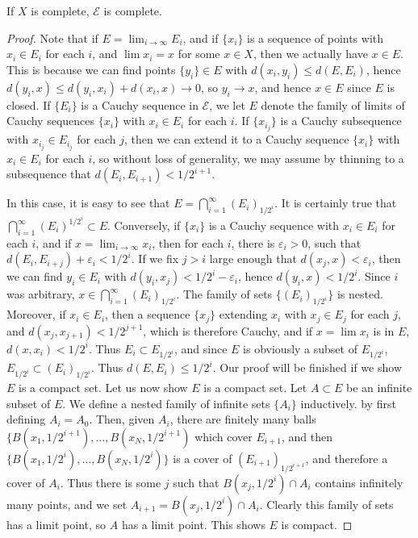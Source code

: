 \begin{theorem}
	If $X$ is complete, $\mathcal{E}$ is complete.
\end{theorem}
\begin{proof}
	Note that if $E = \lim_{i \to \infty} E_i$, and if $\{ x_i \}$ is a sequence of points with $x_i \in E_i$ for each $i$, and $\lim x_i = x$ for some $x \in X$, then we actually have $x \in E$. This is because we can find points $\{ y_i \} \in E$ with $d(x_i,y_i) \leq d(E,E_i)$, hence $d(y_i,x) \leq d(y_i,x_i) + d(x_i,x) \to 0$, so $y_i \to x$, and hence $x \in E$ since $E$ is closed. If $\{ E_i \}$ is a Cauchy sequence in $\mathcal{E}$, we let $E$ denote the family of limits of Cauchy sequences $\{ x_i \}$ with $x_i \in E_i$ for each $i$. If $\{ x_{i_j} \}$ is a Cauchy subsequence with $x_{i_j} \in E_{i_j}$ for each $j$, then we can extend it to a Cauchy sequence $\{ x_i \}$ with $x_i \in E_i$ for each $i$, so without loss of generality, we may assume by thinning to a subsequence that $d(E_i,E_{i+1}) < 1/2^{i+1}$.

	In this case, it is easy to see that $E = \bigcap_{i = 1}^\infty (E_i)_{1/2^i}$. It is certainly true that $\bigcap_{i = 1}^\infty (E_i)^{1/2^i} \subset E$. Conversely, if $\{ x_i \}$ is a Cauchy sequence with $x_i \in E_i$ for each $i$, and if $x = \lim_{i \to \infty} x_i$, then for each $i$, there is $\varepsilon_i > 0$, such that $d(E_i,E_{i+j}) + \varepsilon_i < 1/2^i$. If we fix $j > i$ large enough that $d(x_j,x) < \varepsilon_i$, then we can find $y_i \in E_i$ with $d(y_i,x_j) < 1/2^i - \varepsilon_i$, hence $d(y_i,x) < 1/2^i$. Since $i$ was arbitrary, $x \in \bigcap_{i = 1}^\infty (E_i)_{1/2^i}$. The family of sets $\{ (E_i)_{1/2^i} \}$ is nested. Moreover, if $x_i \in E_i$, then a sequence $\{ x_j \}$ extending $x_i$ with $x_j \in E_j$ for each $j$, and $d(x_j,x_{j+1}) < 1/2^{j+1}$, which is therefore Cauchy, and if $x = \lim x_i$ is in $E$, $d(x,x_i) < 1/2^i$. Thus $E_i \subset E_{1/2^i}$, and since $E$ is obviously a subset of $E_{1/2^i}$, $E_{1/2^i} \subset (E_i)_{1/2^i}$. Thus $d(E,E_i) \leq 1/2^i$. Our proof will be finished if we show $E$ is a compact set. Let us now show $E$ is a compact set. Let $A \subset E$ be an infinite subset of $E$. We define a nested family of infinite sets $\{ A_i \}$ inductively. by first defining $A_i = A_0$. Then, given $A_i$, there are finitely many balls $\{ B(x_1,1/2^{i+1}), \dots, B(x_N,1/2^{i+1})$ which cover $E_{i+1}$, and then $\{ B(x_1,1/2^i), \dots, B(x_N,1/2^i) \}$ is a cover of $(E_{i+1})_{1/2^{i+1}}$, and therefore a cover of $A_i$. Thus there is some $j$ such that $B(x_j,1/2^i) \cap A_i$ contains infinitely many points, and we set $A_{i+1} = B(x_j,1/2^i) \cap A_i$. Clearly this family of sets has a limit point, so $A$ has a limit point. This shows $E$ is compact.
\end{proof}

